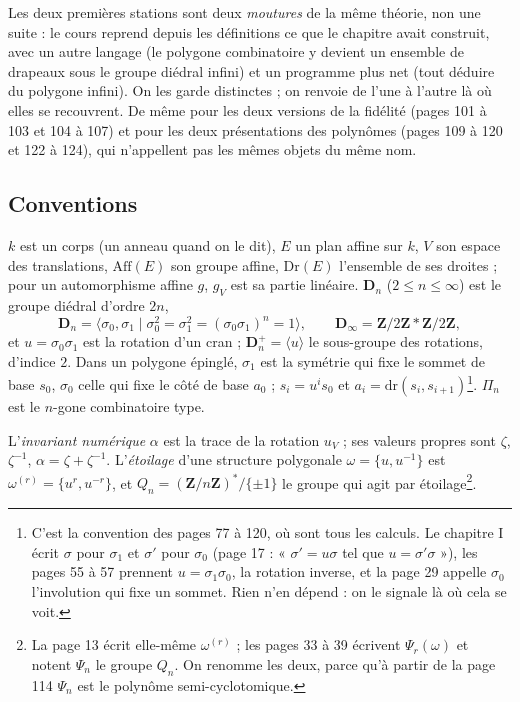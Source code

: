\documentclass[11pt,a4paper]{article}
\begin{document}
Les deux premières stations sont deux \emph{moutures} de la même théorie,
non une suite : le cours reprend depuis les définitions ce que le chapitre
avait construit, avec un autre langage (le polygone combinatoire y devient un
ensemble de drapeaux sous le groupe diédral infini) et un programme plus net
(tout déduire du polygone infini). On les garde distinctes ; on renvoie de
l'une à l'autre là où elles se recouvrent. De même pour les deux versions de
la fidélité (pages 101 à 103 et 104 à 107) et pour les deux présentations des
polynômes (pages 109 à 120 et 122 à 124), qui n'appellent pas les mêmes
objets du même nom.

\subsection*{Conventions}

$k$ est un corps (un anneau quand on le dit), $E$ un plan affine sur $k$, $V$
son espace des translations, $\mathrm{Aff}(E)$ son groupe affine,
$\mathrm{Dr}(E)$ l'ensemble de ses droites ; pour un automorphisme affine $g$,
$g_V$ est sa partie linéaire. $\mathbf{D}_n$ ($2 \leq n \leq \infty$) est le
groupe diédral d'ordre $2n$,
\[
  \mathbf{D}_n = \langle \sigma_0, \sigma_1 \mid \sigma_0^2 = \sigma_1^2 =
  (\sigma_0\sigma_1)^n = 1 \rangle , \qquad
  \mathbf{D}_\infty = \mathbf{Z}/2\mathbf{Z} * \mathbf{Z}/2\mathbf{Z} ,
\]
et $u = \sigma_0 \sigma_1$ est la rotation d'un cran ; $\mathbf{D}_n^{+} =
\langle u \rangle$ le sous-groupe des rotations, d'indice $2$. Dans un
polygone épinglé, $\sigma_1$ est la symétrie qui fixe le sommet de base
$s_0$, $\sigma_0$ celle qui fixe le côté de base $a_0$ ; $s_i = u^i s_0$ et
$a_i = \mathrm{dr}(s_i, s_{i+1})$\footnote{C'est la convention des pages 77
à 120, où sont tous les calculs. Le chapitre I écrit $\sigma$ pour
$\sigma_1$ et $\sigma'$ pour $\sigma_0$ (page 17 : « $\sigma' = u\sigma$ tel
que $u = \sigma'\sigma$ »), les pages 55 à 57 prennent $u = \sigma_1\sigma_0$,
la rotation inverse, et la page 29 appelle $\sigma_0$ l'involution qui fixe un
sommet. Rien n'en dépend : on le signale là où cela se voit.}. $\Pi_n$ est le
$n$-gone combinatoire type.

L'\emph{invariant numérique} $\alpha$ est la trace de la rotation $u_V$ ; ses
valeurs propres sont $\zeta$, $\zeta^{-1}$, $\alpha = \zeta + \zeta^{-1}$.
L'\emph{étoilage} d'une structure polygonale $\omega = \{u, u^{-1}\}$ est
$\omega^{(r)} = \{u^r, u^{-r}\}$, et $Q_n = (\mathbf{Z}/n\mathbf{Z})^{*}/\{\pm
1\}$ le groupe qui agit par étoilage\footnote{La page 13 écrit elle-même
$\omega^{(r)}$ ; les pages 33 à 39 écrivent $\Psi_r(\omega)$ et notent
$\Psi_n$ le groupe $Q_n$. On renomme les deux, parce qu'à partir de la page 114
$\Psi_n$ est le polynôme semi-cyclotomique.}.
\end{document}
